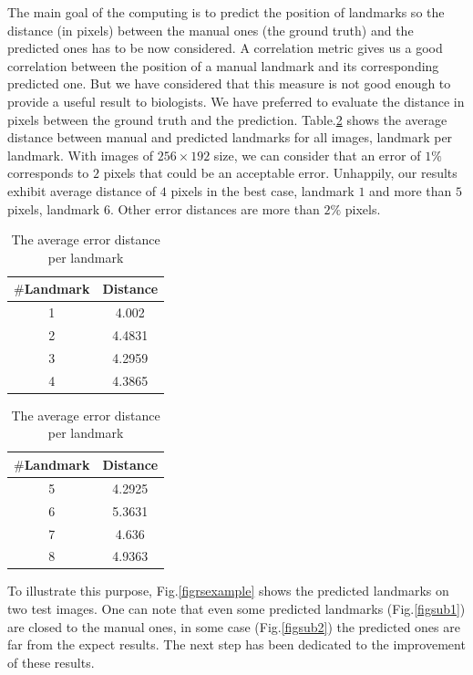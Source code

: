 \documentclass[10pt]{article}
\begin{document}
The main goal of the computing is to predict the position of landmarks so
the distance (in pixels) between the manual ones (the ground truth)
and the predicted ones has to be now considered. A correlation metric
gives us a good correlation between the position of a manual landmark and
its corresponding predicted one. But we have considered that this
measure is not good enough to provide a useful result to biologists. We
have preferred to evaluate the distance in pixels between the ground
truth and the prediction. Table.\ref{tabledistance} shows the
average distance between manual and predicted landmarks for all
images, landmark per landmark. With images of $256 \times 192$ size, we
can consider that an error of $1\%$ corresponds to $2$ pixels that
could be an acceptable error. Unhappily, our results exhibit
average distance of $4$ pixels in the best case, landmark $1$ and more
than $5$ pixels, landmark $6$. Other error distances are more than $2\%$
pixels.


\begin{table}[h!]
	\begin{subtable}{.22\linewidth}
	\centering
	\begin{tabular}{|c|c| }
	\hline
	\textbf{$\#$Landmark} & \textbf{Distance} \\ \hline
	1 & 4.002  \\ \hline
	2 & 4.4831 \\ \hline
	3 & 4.2959 \\ \hline
	4 & 4.3865 \\ \hline
	
	\end{tabular}
	\end{subtable}%
	\hspace{2.5cm}
	\begin{subtable}{.2\linewidth}
	\centering
	\begin{tabular}{|c|c| }
	\hline
	\textbf{$\#$Landmark} & \textbf{Distance} \\ \hline
	5 & 4.2925 \\ \hline
	6 & 5.3631 \\ \hline
	7 & 4.636 \\ \hline
	8 & 4.9363 \\ \hline
	\end{tabular}
	\end{subtable}
	\caption{\small{The average error distance per landmark}}
	\label{tabledistance}
\end{table}

To illustrate this purpose, Fig.\ref{figrsexample} shows the predicted landmarks on two test images. One can note that even some predicted landmarks (Fig.\ref{figsub1})
are closed to the manual ones, in some case (Fig.\ref{figsub2}) the predicted
ones are far from the expect results. The next step has been dedicated
to the improvement of these results.
\end{document}
